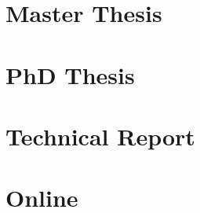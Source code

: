\documentclass[
  a4paper, %
  11pt, %
  oneside,  %
]{scrartcl}
\begin{document}
\printbibliography[type=book, title=Book References]


\section{Master Thesis}
\indent
\par\cite{Carvalho2002}
\par\cite{Evangelista2018}
\par\cite{Lozano2019}
\par\cite{Reis2019}

\printbibliography[type=masterthesis, title=Masterthesis References]


\section{PhD Thesis}
\indent
\par\cite{Balan2017}
\par\cite{Monteiro2015}

\printbibliography[type=phdthesis, title=Phdthesis References]


\section{Technical Report}
\indent
\par\cite{Abello2017}
\par\cite{Duque2018}
\par\cite{Fiby2020}
\par\cite{Miller2011}
\par\cite{Palomero2015}
\par\cite{Ruivo2022}
\par\cite{Trovao2019}

\printbibliography[type=techreport, title=Techreport References]



\section{Online}
\indent
\par\cite{ZooBarcelona:AnimalsandPlants}
\par\cite{ZooBarcelona:Timeline}

\printbibliography[type=online, title=Online References]


\end{document}
